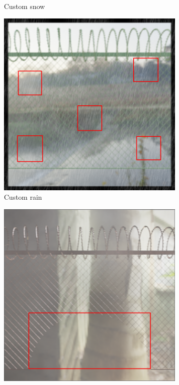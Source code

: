 \documentclass[../Head/Main.tex]{subfiles}
\begin{document}
\begin{figure}[H]
\begin{subfigure}{.3\textwidth}
        \caption{Custom snow}
        \label{fig:custom_snow}
    \end{subfigure}
    \hfill
    \begin{subfigure}{.3\textwidth}
        \centering
        \includegraphics[width=\textwidth]{../Figures/augmentations/img_bb62.png}
        \caption{Custom rain}
        \label{fig:custom_rain}
    \end{subfigure}
    \hfill
    \begin{subfigure}{.3\textwidth}
        \centering
        \includegraphics[width=\textwidth]{../Figures/augmentations/img_bb161.png}

\end{subfigure}
\end{figure}
\end{document}
